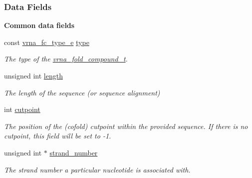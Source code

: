 \subsubsection*{Data Fields}
\begin{Indent}\textbf{ Common data fields}\par
\begin{DoxyCompactItemize}
\item 
const \mbox{\hyperlink{group__fold__compound_ga01a4ff86fa71deaaa5d1abbd95a1447d}{vrna\+\_\+fc\+\_\+type\+\_\+e}} \mbox{\hyperlink{group__fold__compound_a391bcf8ac5997784aaf780cdd251c464}{type}}
\begin{DoxyCompactList}\small\item\em The type of the \mbox{\hyperlink{group__fold__compound_ga1b0cef17fd40466cef5968eaeeff6166}{vrna\+\_\+fold\+\_\+compound\+\_\+t}}. \end{DoxyCompactList}\item 
\mbox{\label{group__fold__compound_a95fbfed770b858e50c766505dc4bf998}} 
unsigned int \mbox{\hyperlink{group__fold__compound_a95fbfed770b858e50c766505dc4bf998}{length}}
\begin{DoxyCompactList}\small\item\em The length of the sequence (or sequence alignment) \end{DoxyCompactList}\item 
\mbox{\label{group__fold__compound_ae1a7bbff0256577e2b22709bac11fdb4}} 
int \mbox{\hyperlink{group__fold__compound_ae1a7bbff0256577e2b22709bac11fdb4}{cutpoint}}
\begin{DoxyCompactList}\small\item\em The position of the (cofold) cutpoint within the provided sequence. If there is no cutpoint, this field will be set to -\/1. \end{DoxyCompactList}\item 
\mbox{\label{group__fold__compound_a23304c5186dfae97bc69dc19d37f70c3}} 
unsigned int $\ast$ \mbox{\hyperlink{group__fold__compound_a23304c5186dfae97bc69dc19d37f70c3}{strand\+\_\+number}}
\begin{DoxyCompactList}\small\item\em The strand number a particular nucleotide is associated with. \end{DoxyCompactList}\item 

\end{DoxyCompactItemize}
\end{Indent}
